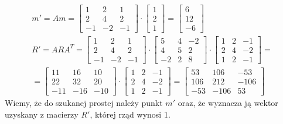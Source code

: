\begin{gather*}
m'=Am=
\begin{bmatrix}
	1  & 2  & 1  \\
	2  & 4  & 2  \\
	-1 & -2 & -1
\end{bmatrix}\cdot
\begin{bmatrix}
	1 \\
	2 \\
	1
\end{bmatrix}=
\begin{bmatrix}
	6  \\
	12 \\
	-6
\end{bmatrix}\\
R'=ARA^T=
\begin{bmatrix}
	1  & 2  & 1  \\
	2  & 4  & 2  \\
	-1 & -2 & -1
\end{bmatrix}\cdot
\begin{bmatrix}
	5  & 4 & -2 \\
	4  & 5 & 2  \\
	-2 & 2 & 8
\end{bmatrix}\cdot
\begin{bmatrix}
	1 & 2 & -1 \\
	2 & 4 & -2 \\
	1 & 2 & -1
\end{bmatrix}
=\\=
\begin{bmatrix}
	11  & 16  & 10  \\
	22  & 32  & 20  \\
	-11 & -16 & -10
\end{bmatrix}\cdot
\begin{bmatrix}
 	1 & 2 & -1 \\
 	2 & 4 & -2 \\
 	1 & 2 & -1
\end{bmatrix}=
\begin{bmatrix}
	53  & 106  & -53  \\
	106 & 212  & -106 \\
	-53 & -106 & 53
\end{bmatrix} 
\end{gather*}
Wiemy, że do szukanej prostej należy punkt $ m' $ oraz, że wyznacza ją wektor uzyskany z macierzy $ R' $, której rząd wynosi 1.
